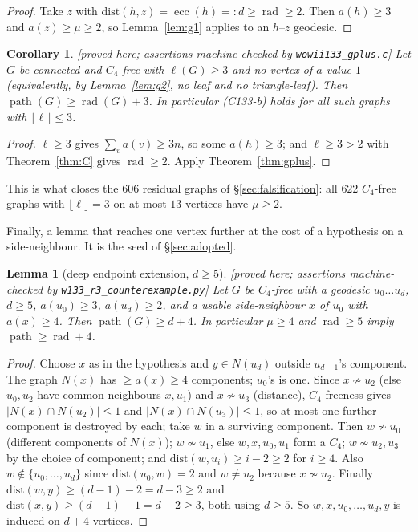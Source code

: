 \documentclass[11pt]{article}
\theoremstyle{plain}
\newtheorem{lemma}[theorem]{Lemma}
\newtheorem{corollary}[theorem]{Corollary}
\theoremstyle{definition}
\theoremstyle{remark}
\numberwithin{equation}{section}
\newcommand{\rad}{\operatorname{rad}}
\newcommand{\ecc}{\operatorname{ecc}}
\newcommand{\pth}{\operatorname{path}}
\newcommand{\statusbox}[1]{{\small\sloppy\textsf{[#1]}}}
\newcommand{\PRV}[1]{\statusbox{proved here; assertions machine-checked by \texttt{#1}}}
\begin{document}
\begin{proof}
Take $z$ with $\mathrm{dist}(h,z) = \ecc(h) =: d \ge \rad \ge 2$. Then $a(h) \ge 3$ and
$a(z) \ge \mu \ge 2$, so Lemma~\ref{lem:g1} applies to an $h$--$z$ geodesic.
\end{proof}

\begin{corollary}\label{cor:gplus1}
\PRV{wowii133\_gplus.c}
Let $G$ be connected and $C_4$-free with $\ell(G) \ge 3$ and no vertex of $a$-value $1$
(equivalently, by Lemma~\ref{lem:g2}, no leaf and no triangle-leaf). Then
$\pth(G) \ge \rad(G) + 3$. In particular (C133-b) holds for all such graphs with
$\lfloor \ell\rfloor \le 3$.
\end{corollary}

\begin{proof}
$\ell \ge 3$ gives $\sum_v a(v) \ge 3n$, so some $a(h) \ge 3$; and $\ell \ge 3 > 2$ with
Theorem~\ref{thm:C} gives $\rad \ge 2$. Apply Theorem~\ref{thm:gplus}.
\end{proof}

This is what closes the $606$ residual graphs of \S\ref{sec:falsification}: all $622$
$C_4$-free graphs with $\lfloor\ell\rfloor = 3$ on at most $13$ vertices have $\mu \ge 2$.

Finally, a lemma that reaches one vertex further at the cost of a hypothesis on a
side-neighbour. It is the seed of \S\ref{sec:adopted}.

\begin{lemma}[deep endpoint extension, $d \ge 5$]\label{lem:g14}
\PRV{w133\_r3\_counterexample.py}
Let $G$ be $C_4$-free with a geodesic $u_0 \dots u_d$, $d \ge 5$, $a(u_0) \ge 3$,
$a(u_d) \ge 2$, and a usable side-neighbour $x$ of $u_0$ with $a(x) \ge 4$. Then
$\pth(G) \ge d + 4$. In particular $\mu \ge 4$ and $\rad \ge 5$ imply $\pth \ge \rad + 4$.
\end{lemma}

\begin{proof}
Choose $x$ as in the hypothesis and $y \in N(u_d)$ outside $u_{d-1}$'s component. The graph
$N(x)$ has $\ge a(x) \ge 4$ components; $u_0$'s is one. Since $x \not\sim u_2$ (else
$u_0, u_2$ have common neighbours $x, u_1$) and $x \not\sim u_3$ (distance),
$C_4$-freeness gives $|N(x) \cap N(u_2)| \le 1$ and $|N(x) \cap N(u_3)| \le 1$, so at most
one further component is destroyed by each; take $w$ in a surviving component. Then
$w \not\sim u_0$ (different components of $N(x)$); $w \not\sim u_1$, else $w, x, u_0, u_1$
form a $C_4$; $w \not\sim u_2, u_3$ by the choice of component; and
$\mathrm{dist}(w,u_i) \ge i - 2 \ge 2$ for $i \ge 4$. Also $w \notin \{u_0,\dots,u_d\}$
since $\mathrm{dist}(u_0,w) = 2$ and $w \ne u_2$ because $x \not\sim u_2$. Finally
$\mathrm{dist}(w,y) \ge (d-1) - 2 = d-3 \ge 2$ and $\mathrm{dist}(x,y) \ge (d-1)-1 = d-2 \ge
3$, both using $d \ge 5$. So $w, x, u_0, \dots, u_d, y$ is induced on $d+4$ vertices.
\end{proof}
\end{document}
